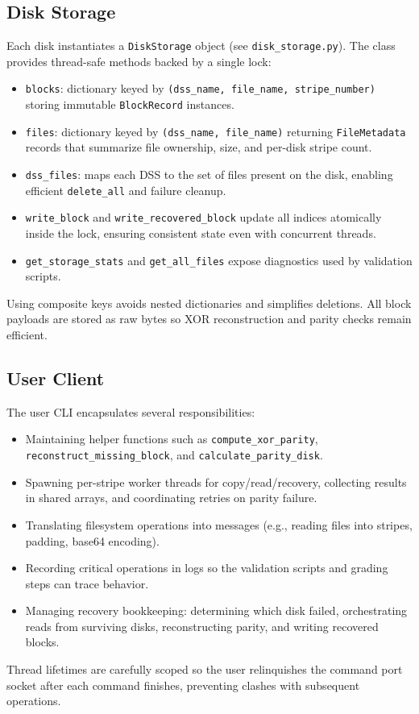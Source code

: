 \documentclass[11pt]{article}
\begin{document}
\subsection{Disk Storage}
Each disk instantiates a \texttt{DiskStorage} object (see \texttt{disk\_storage.py}). The class provides thread-safe methods backed by a single lock:
\begin{itemize}
  \item \texttt{blocks}: dictionary keyed by \texttt{(dss\_name, file\_name, stripe\_number)} storing immutable \texttt{BlockRecord} instances.
  \item \texttt{files}: dictionary keyed by \texttt{(dss\_name, file\_name)} returning \texttt{FileMetadata} records that summarize file ownership, size, and per-disk stripe count.
  \item \texttt{dss\_files}: maps each DSS to the set of files present on the disk, enabling efficient \texttt{delete\_all} and failure cleanup.
  \item \texttt{write\_block} and \texttt{write\_recovered\_block} update all indices atomically inside the lock, ensuring consistent state even with concurrent threads.
  \item \texttt{get\_storage\_stats} and \texttt{get\_all\_files} expose diagnostics used by validation scripts.
\end{itemize}
Using composite keys avoids nested dictionaries and simplifies deletions. All block payloads are stored as raw bytes so XOR reconstruction and parity checks remain efficient.

\subsection{User Client}
The user CLI encapsulates several responsibilities:
\begin{itemize}
  \item Maintaining helper functions such as \texttt{compute\_xor\_parity}, \texttt{reconstruct\_missing\_block}, and \texttt{calculate\_parity\_disk}.
  \item Spawning per-stripe worker threads for copy/read/recovery, collecting results in shared arrays, and coordinating retries on parity failure.
  \item Translating filesystem operations into messages (e.g., reading files into stripes, padding, base64 encoding).
  \item Recording critical operations in logs so the validation scripts and grading steps can trace behavior.
  \item Managing recovery bookkeeping: determining which disk failed, orchestrating reads from surviving disks, reconstructing parity, and writing recovered blocks.
\end{itemize}
Thread lifetimes are carefully scoped so the user relinquishes the command port socket after each command finishes, preventing clashes with subsequent operations.
\end{document}
